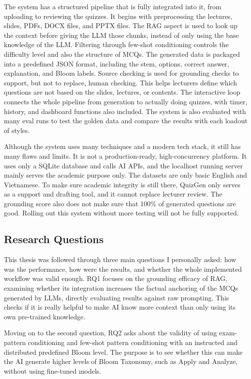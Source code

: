 \documentclass[12pt,a4paper]{article}
\begin{document}
The system has a structured pipeline that is fully integrated into it, from
uploading to reviewing the quizzes. It begins with preprocessing the
lectures, slides, PDFs, DOCX files, and PPTX files. The RAG aspect is used
to look up the context before giving the LLM those chunks, instead of only
using the base knowledge of the LLM. Filtering through few-shot conditioning
controls the difficulty level and also the structure of MCQs. The generated
data is packaged into a predefined JSON format, including the stem, options,
correct answer, explanation, and Bloom labels. Source checking is used for
grounding checks to support, but not to replace, human checking. This helps
lecturers define which questions are not based on the slides, lectures, or
contents. The interactive loop connects the whole pipeline from generation
to actually doing quizzes, with timer, history, and dashboard functions also
included. The system is also evaluated with many eval runs to test the golden
data and compare the results with each loadout of styles.

Although the system uses many techniques and a modern tech stack, it still
has many flaws and limits. It is not a production-ready, high-concurrency
platform. It uses only a SQLite database and calls AI APIs, and the localhost
running server mainly serves the academic purpose only. The datasets are
only basic English and Vietnamese. To make sure academic integrity is still
there, QuizGen only serves as a support and drafting tool, and it cannot
replace lecturer review. The grounding score also does not make sure that
100\% of generated questions are good. Rolling out this system without more
testing will not be fully supported.

\subsection{Research Questions}

This thesis was followed through three main questions I personally asked:
how was the performance, how were the results, and whether the whole
implemented workflow was valid enough. RQ1 focuses on the grounding efficacy
of RAG, examining whether its integration increases the factual anchoring of
the MCQs generated by LLMs, directly evaluating results against raw
prompting. This checks if it is really helpful to make AI know more context
than only using its own pre-trained knowledge.

Moving on to the second question, RQ2 asks about the validity of using
exam-pattern conditioning and few-shot pattern conditioning with an
instructed and distributed predefined Bloom level. The purpose is to see
whether this can make the AI generate higher levels of Bloom Taxonomy, such
as Apply and Analyze, without using fine-tuned models.
\end{document}
